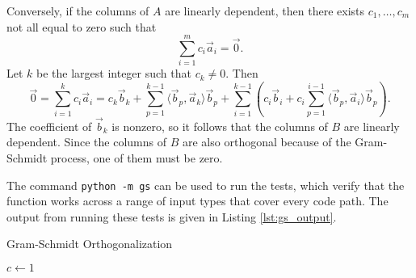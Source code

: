 \documentclass{homework}
\begin{document}
	Conversely, if the columns of $A$ are linearly dependent, then there exists $c_1,\dots, c_m$ not all equal to zero such that
	\begin{equation*}
		\sum_{i=1}^m c_i\vec{a}_i = \vec{0}.
	\end{equation*}
	Let $k$ be the largest integer such that $c_k \ne 0$. Then
	\begin{equation*}
		\vec{0} = \sum_{i=1}^kc_i\vec{a}_i = c_k\vec{b}_k  + \sum_{p=1}^{k-1}\langle\vec{b}_p,\vec{a}_k\rangle\vec{b}_p + \sum_{i=1}^{k-1}\left(c_i\vec{b}_i + c_i\sum_{p=1}^{i-1}\langle\vec{b}_p,\vec{a}_i\rangle\vec{b}_p\right).
	\end{equation*}
	The coefficient of $\vec{b}_k$ is nonzero, so it follows that the columns of $B$ are linearly dependent. Since the columns of $B$ are also orthogonal because of the Gram-Schmidt process, one of them must be zero.
	
	The command \texttt{python -m gs} can be used to run the tests, which verify that the function works across a range of input types that cover every code path. The output from running these tests is given in Listing \ref{lst:gs_output}.
	\begin{algorithm}
		\caption{Gram-Schmidt Orthogonalization}\label{alg:gs}
		$c \gets 1$\;
	\end{algorithm}
	
	
\end{document}
